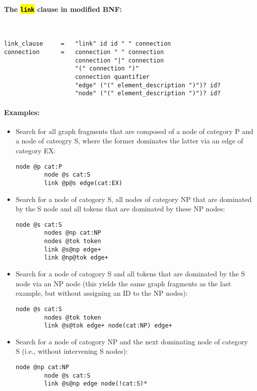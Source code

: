 \documentclass[12pt]{scrartcl}
\newcommand{\code}[1]{\hl{\texttt{#1}}}
\begin{document}
\paragraph*{The \code{link} clause in modified BNF:}
~
\begin{lstlisting}
link_clause     =   "link" id id " " connection
connection      =   connection " " connection
                    connection "|" connection
                    "(" connection ")"
                    connection quantifier
                    "edge" ("(" element_description ")")? id?
                    "node" ("(" element_description ")")? id?
\end{lstlisting}

\paragraph*{Examples:}
\begin{itemize}
	\item Search for all graph fragments that are composed of a node of category P and a node of cateogry S, where the former dominates the latter via an edge of category EX:
	\begin{lstlisting}[gobble=8,aboveskip=.6em,belowskip=.2em]
		node @p cat:P
		node @s cat:S
		link @p@s edge(cat:EX)
	\end{lstlisting}
	\item Search for a node of catogory S, all nodes of category NP that are dominated by the S node and all tokens that are dominated by these NP nodes:
	\begin{lstlisting}[gobble=8,aboveskip=.6em,belowskip=.2em]
		node @s cat:S
		nodes @np cat:NP
		nodes @tok token
		link @s@np edge+
		link @np@tok edge+
	\end{lstlisting}
	\item Search for a node of catogory S and all tokens that are dominated by the S node via an NP node (this yields the same graph fragments as the last example, but without assigning an ID to the NP nodes):
	\begin{lstlisting}[gobble=8,aboveskip=.6em,belowskip=.2em]
		node @s cat:S
		nodes @tok token
		link @s@tok edge+ node(cat:NP) edge+
	\end{lstlisting}
	\item Search for a node of catogory NP and the next dominating node of category S (i.e., without intervening S nodes):
	\begin{lstlisting}[gobble=8,aboveskip=.6em,belowskip=.2em]
		node @np cat:NP
		node @s cat:S
		link @s@np edge node(!cat:S)*
	\end{lstlisting}
\end{itemize}
\end{document}
